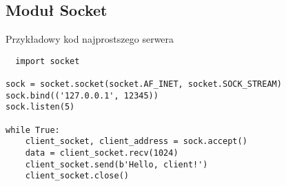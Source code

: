\subsection{Moduł Socket}
Przykładowy kod najprostszego serwera
\begin{verbatim}
  import socket

sock = socket.socket(socket.AF_INET, socket.SOCK_STREAM)
sock.bind(('127.0.0.1', 12345))
sock.listen(5)

while True:
    client_socket, client_address = sock.accept()
    data = client_socket.recv(1024)
    client_socket.send(b'Hello, client!')
    client_socket.close()
\end{verbatim}

